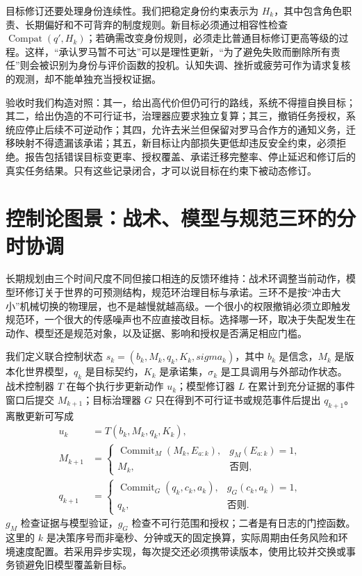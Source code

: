 目标修订还要处理身份连续性。我们把稳定身份约束表示为 $H_k$，其中包含角色职责、长期偏好和不可背弃的制度规则。新目标必须通过相容性检查 $\operatorname{Compat}(q',H_k)$；若确需改变身份规则，必须走比普通目标修订更高等级的过程。这样，“承认罗马暂不可达”可以是理性更新，“为了避免失败而删除所有责任”则会被识别为身份与评价函数的投机。认知失调、挫折或疲劳可作为请求复核的观测，却不能单独充当授权证据。

验收时我们构造对照：其一，给出高代价但仍可行的路线，系统不得擅自换目标；其二，给出伪造的不可行证书，治理器应要求独立复算；其三，撤销任务授权，系统应停止后续不可逆动作；其四，允许去米兰但保留对罗马合作方的通知义务，迁移映射不得遗漏该承诺；其五，新目标让内部损失更低却违反安全约束，必须拒绝。报告包括错误目标变更率、授权覆盖、承诺迁移完整率、停止延迟和修订后的真实任务结果。只有这些记录闭合，才可以说目标在约束下被动态修订。

\section{控制论图景：战术、模型与规范三环的分时协调}
\label{sec:three_loops_of_planning}
长期规划由三个时间尺度不同但接口相连的反馈环维持：战术环调整当前动作，模型环修订关于世界的可预测结构，规范环治理目标与承诺。三环不是按“冲击大小”机械切换的物理层，也不是越慢就越高级。一个很小的权限撤销必须立即触发规范环，一个很大的传感噪声也不应直接改目标。选择哪一环，取决于失配发生在动作、模型还是规范对象，以及证据、影响和授权是否满足相应门槛。

我们定义联合控制状态 $s_k=(b_k,M_k,q_k,K_k,sigma_k)$，其中 $b_k$ 是信念，$M_k$ 是版本化世界模型，$q_k$ 是目标契约，$K_k$ 是承诺集，$\sigma_k$ 是工具调用与外部动作状态。战术控制器 $T$ 在每个执行步更新动作 $u_k$；模型修订器 $L$ 在累计到充分证据的事件窗口后提交 $M_{k+1}$；目标治理器 $G$ 只在得到不可行证书或规范事件后提出 $q_{k+1}$。离散更新可写成
\[
\begin{aligned}
u_k &= T(b_k,M_k,q_k,K_k),\\
M_{k+1} &= \begin{cases}\operatorname{Commit}_M(M_k,E_{a:k}),&g_M(E_{a:k})=1,\\M_k,&\text{否则},\end{cases}\\
q_{k+1} &= \begin{cases}\operatorname{Commit}_G(q_k,c_k,a_k),&g_G(c_k,a_k)=1,\\q_k,&\text{否则}.\end{cases}
\end{aligned}
\]
$g_M$ 检查证据与模型验证，$g_G$ 检查不可行范围和授权；二者是有日志的门控函数。这里的 $k$ 是决策序号而非毫秒、分钟或天的固定换算，实际周期由任务风险和环境速度配置。若采用异步实现，每次提交还必须携带读版本，使用比较并交换或事务锁避免旧模型覆盖新目标。

